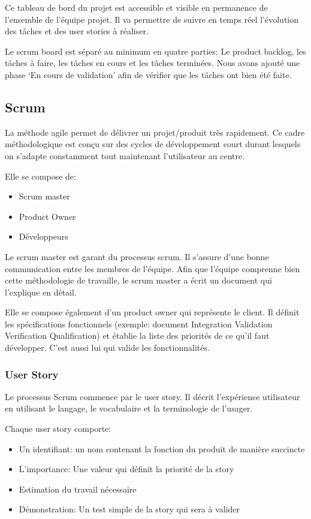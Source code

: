 Ce tableau de bord du projet est accessible et visible en permanence de l'ensemble de l'équipe projet.
Il va permettre de suivre en temps réel l'évolution des tâches et des user stories à réaliser.

Le scrum board est séparé au minimum en quatre parties: Le product backlog, les tâches à faire, les tâches en cours et les tâches terminées.
Nous avons ajouté une phase `En cours de validation' afin de vérifier que les tâches ont bien été faite. 


\subsection{Scrum}
La méthode agile permet de délivrer un projet/produit très rapidement.
Ce cadre méthodologique est conçu sur des cycles de développement court durant lesquels on s'adapte constamment tout maintenant l'utilisateur au centre. 

Elle se compose de:
\begin{itemize}
    \item Scrum master 
    \item Product Owner 
    \item Développeurs 
\end{itemize}

Le scrum master est garant du processus scrum.
Il s'assure d’une bonne communication entre les membres de l'équipe.
Afin que l'équipe comprenne bien cette méthodologie de travaille, le scrum master a écrit un document qui l'explique en détail.

Elle se compose également d'un product owner qui représente le client.
Il définit les spécifications fonctionnels (exemple:  document Integration Validation Verification Qualification) et établie la liste des priorités de ce qu'il faut développer.
C'est aussi lui qui valide les fonctionnalités.



\subsubsection{User Story}
Le processus Scrum commence par le user story.
Il décrit l'expérience utilisateur en utilisant le langage, le vocabulaire et la terminologie de l'usager.   

Chaque user story comporte: 
\begin{itemize}
    \item Un identifiant: un nom contenant la fonction du produit de manière succincte  
    \item L'importance: Une valeur qui définit la priorité de la story  
    \item Estimation du travail nécessaire
    \item Démonstration: Un test simple de la story qui sera à valider   
\end{itemize}

